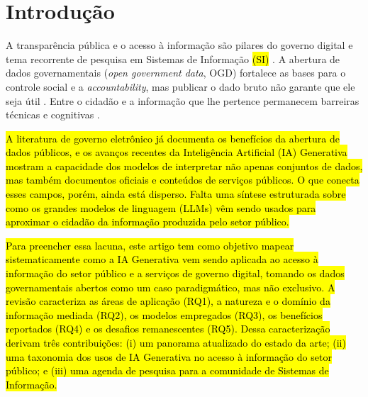 \documentclass[brazilian]{sbc2025}
\newif\ifhl \hltrue
\newcommand{\rev}[1]{\ifhl\sethlcolor{yellow}\hl{#1}\else#1\fi}
\begin{document}
\section{Introdução}
\label{sec:intro}

A transparência pública e o acesso à informação são pilares do governo digital e tema recorrente de pesquisa em Sistemas de Informação \rev{(SI)} \citep{RibeiroAlmeida2011,OliveiraCkagnazaroff2022}. A abertura de dados governamentais (\emph{open government data}, OGD) fortalece as bases para o controle social e a \emph{accountability}, mas publicar o dado bruto não garante que ele seja útil \citep{ZuiderwijkJanssen2014,Vetro2016}. Entre o cidadão e a informação que lhe pertence permanecem barreiras técnicas e cognitivas \citep{Hornung2015,Lee2017}.

\rev{A literatura de governo eletrônico já documenta os benefícios da abertura de dados públicos, e os avanços recentes da Inteligência Artificial (IA) Generativa mostram a capacidade dos modelos de interpretar não apenas conjuntos de dados, mas também documentos oficiais e conteúdos de serviços públicos. O que conecta esses campos, porém, ainda está disperso. Falta uma síntese estruturada sobre como os grandes modelos de linguagem (LLMs) vêm sendo usados para aproximar o cidadão da informação produzida pelo setor público.}

\rev{Para preencher essa lacuna, este artigo tem como objetivo mapear sistematicamente como a IA Generativa vem sendo aplicada ao acesso à informação do setor público e a serviços de governo digital, tomando os dados governamentais abertos como um caso paradigmático, mas não exclusivo. A revisão caracteriza as áreas de aplicação (RQ1), a natureza e o domínio da informação mediada (RQ2), os modelos empregados (RQ3), os benefícios reportados (RQ4) e os desafios remanescentes (RQ5). Dessa caracterização derivam três contribuições: (i) um panorama atualizado do estado da arte; (ii) uma taxonomia dos usos de IA Generativa no acesso à informação do setor público; e (iii) uma agenda de pesquisa para a comunidade de Sistemas de Informação.}
\end{document}
